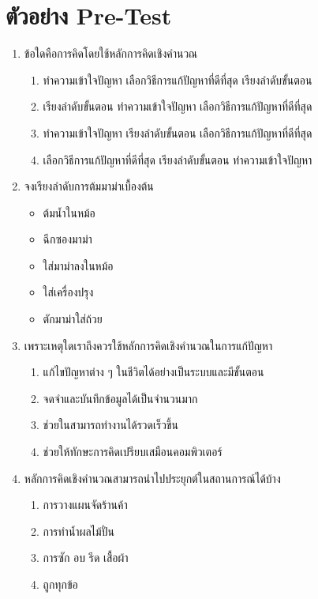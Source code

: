\section{ตัวอย่าง Pre-Test}
\begin{enumerate}
    \item ข้อใดคือการคิดโดยใช้หลักการคิดเชิงคำนวณ
    \begin{enumerate}
        \item ทำความเข้าใจปัญหา เลือกวิธีการแก้ปัญหาที่ดีที่สุด เรียงลำดับขั้นตอน
        \item เรียงลำดับขั้นตอน ทำความเข้าใจปัญหา เลือกวิธีการแก้ปัญหาที่ดีที่สุด
        \item ทำความเข้าใจปัญหา เรียงลำดับขั้นตอน เลือกวิธีการแก้ปัญหาที่ดีที่สุด
        \item เลือกวิธีการแก้ปัญหาที่ดีที่สุด เรียงลำดับขั้นตอน ทำความเข้าใจปัญหา
    \end{enumerate}
    \item จงเรียงลำดับการต้มมาม่าเบื้องต้น
    \begin{itemize}
        \item ต้มน้ำในหม้อ
        \item ฉีกซองมาม่า
        \item ใส่มาม่าลงในหม้อ
        \item ใส่เครื่องปรุง
        \item ตักมาม่าใส่ถ้วย
    \end{itemize}
    \item เพราะเหตุใดเราถึงควรใช้หลักการคิดเชิงคำนวณในการแก้ปัญหา
    \begin{enumerate}
        \item แก้ไขปัญหาต่าง ๆ ในชีวิตได้อย่างเป็นระบบและมีขั้นตอน
        \item จดจำและบันทึกข้อมูลได้เป็นจำนวนมาก
        \item ช่วยในสามารถทำงานได้รวดเร็วขึ้น
        \item ช่วยให้ทักษะการคิดเปรียบเสมือนคอมพิวเตอร์
    \end{enumerate}
    \item หลักการคิดเชิงคำนวณสามารถนำไปประยุกต์ในสถานการณ์ได้บ้าง
    \begin{enumerate}
        \item การวางแผนจัดร้านค้า
        \item การทำน้ำผลไม้ปั่น
        \item การซัก อบ รีด เสื้อผ้า
        \item ถูกทุกข้อ
    \end{enumerate}

\end{enumerate}

